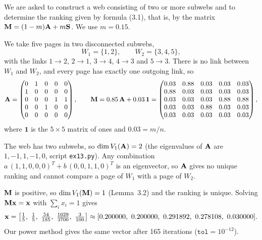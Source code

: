 

We are asked to construct a web consisting of two or more subwebs and to determine the ranking given by formula (3.1), that is, by the matrix $\mathbf{M} = (1-m)\mathbf{A} + m\mathbf{S}$.
We use $m = 0.15$.


We take five pages in two disconnected subwebs,
\[
  W_1 = \{1,2\}, \qquad W_2 = \{3,4,5\},
\]
with the links $1 \to 2$, $2 \to 1$, $3 \to 4$, $4 \to 3$ and $5 \to 3$.
There is no link between $W_1$ and $W_2$, and every page has exactly one outgoing link, so
\[
  \mathbf{A} = \begin{pmatrix}
    0&1&0&0&0\\ 1&0&0&0&0\\ 0&0&0&1&1\\ 0&0&1&0&0\\ 0&0&0&0&0
  \end{pmatrix},
  \qquad
  \mathbf{M} = 0.85\,\mathbf{A} + 0.03\,\mathbf{1} = \begin{pmatrix}
    0.03&0.88&0.03&0.03&0.03\\
    0.88&0.03&0.03&0.03&0.03\\
    0.03&0.03&0.03&0.88&0.88\\
    0.03&0.03&0.88&0.03&0.03\\
    0.03&0.03&0.03&0.03&0.03
  \end{pmatrix},
\]
where $\mathbf{1}$ is the $5 \times 5$ matrix of ones and $0.03 = m/n$.


The web has two subwebs, so $\dim V_1(\mathbf{A}) = 2$ (the eigenvalues of $\mathbf{A}$ are $1,-1,1,-1,0$, script \texttt{ex13.py}).
Any combination $a\,(1,1,0,0,0)^T + b\,(0,0,1,1,0)^T$ is an eigenvector, so $\mathbf{A}$ gives no unique ranking and cannot compare a page of $W_1$ with a page of $W_2$.


$\mathbf{M}$ is positive, so $\dim V_1(\mathbf{M}) = 1$ (Lemma~3.2) and the ranking is unique.
Solving $\mathbf{M}\mathbf{x} = \mathbf{x}$ with $\sum_i x_i = 1$ gives
\[
  \vx = \left[\tfrac{1}{5},\ \tfrac{1}{5},\ \tfrac{54}{185},\ \tfrac{1029}{3700},\ \tfrac{3}{100}\right]
  \approx [0.200000,\ 0.200000,\ 0.291892,\ 0.278108,\ 0.030000].
\]
Our power method gives the same vector after 165 iterations ($\texttt{tol} = 10^{-12}$).

